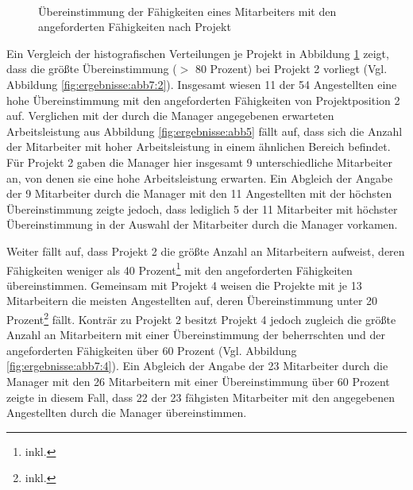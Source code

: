 \begin{figure}
    \\
\caption[Übereinstimmung der Fähigkeiten eines Mitarbeiters mit den angeforderten Fähigkeiten nach Projekt]{Übereinstimmung der Fähigkeiten eines Mitarbeiters mit den angeforderten Fähigkeiten nach Projekt}
  \label{fig:ergebnisse:abb7}
\end{figure}

Ein Vergleich der histografischen Verteilungen je Projekt in Abbildung \ref{fig:ergebnisse:abb7} zeigt, dass die größte Übereinstimmung ($>$ 80 Prozent) bei Projekt 2 vorliegt (Vgl. Abbildung \ref{fig:ergebnisse:abb7:2}).
Insgesamt wiesen 11 der 54 Angestellten eine hohe Übereinstimmung mit den angeforderten Fähigkeiten von Projektposition 2 auf.
Verglichen mit der durch die Manager angegebenen erwarteten Arbeitsleistung aus Abbildung \ref{fig:ergebnisse:abb5} fällt auf, dass sich die Anzahl der Mitarbeiter mit hoher Arbeitsleistung in einem ähnlichen Bereich befindet.
Für Projekt 2 gaben die Manager hier insgesamt 9 unterschiedliche Mitarbeiter an, von denen sie eine hohe Arbeitsleistung erwarten.
Ein Abgleich der Angabe der 9 Mitarbeiter durch die Manager mit den 11 Angestellten mit der höchsten Übereinstimmung zeigte jedoch, dass lediglich 5 der 11 Mitarbeiter mit höchster Übereinstimmung in der Auswahl der Mitarbeiter durch die Manager vorkamen.

Weiter fällt auf, dass Projekt 2 die größte Anzahl an Mitarbeitern aufweist, deren Fähigkeiten weniger als 40 Prozent\footnote{inkl.} mit den angeforderten Fähigkeiten übereinstimmen.
Gemeinsam mit Projekt 4 weisen die Projekte mit je 13 Mitarbeitern die meisten Angestellten auf, deren Übereinstimmung unter 20 Prozent\footnote{inkl.} fällt.
Konträr zu Projekt 2 besitzt Projekt 4 jedoch zugleich die größte Anzahl an Mitarbeitern mit einer Übereinstimmung der beherrschten und der angeforderten Fähigkeiten über 60 Prozent (Vgl. Abbildung \ref{fig:ergebnisse:abb7:4}).
Ein Abgleich der Angabe der 23 Mitarbeiter durch die Manager mit den 26 Mitarbeitern mit einer Übereinstimmung über 60 Prozent zeigte in diesem Fall, dass 22 der 23 fähgisten Mitarbeiter mit den angegebenen Angestellten durch die Manager übereinstimmen.


